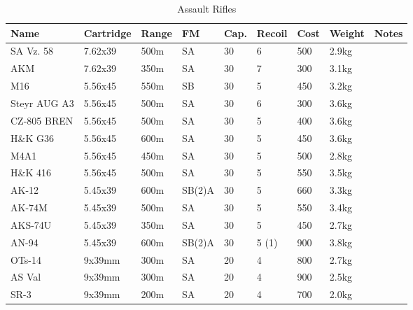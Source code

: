 \begin{table}
  \caption{Assault Rifles}
  \label{tab:AssaultRifles}
  \begin{center}
    \begin{tabular}{| l | l | l | l | l | l | l | l | l |}
      \hline
      \textbf{Name} & \textbf{Cartridge} & \textbf{Range} &
      \textbf{FM} & \textbf{Cap.} & \textbf{Recoil} &
      \textbf{Cost} & \textbf{Weight} & \textbf{Notes} \\ \hline

      SA Vz. 58    & 7.62x39 & 500m & SA  & 30 & 6 & 500 & 2.9kg & \\ \hline
      AKM          & 7.62x39 & 350m & SA  & 30 & 7 & 300 & 3.1kg & \\ \hline

      M16          & 5.56x45 & 550m & SB  & 30 & 5 & 450 & 3.2kg & \\ \hline
      Steyr AUG A3 & 5.56x45 & 500m & SA  & 30 & 6 & 300 & 3.6kg & \\ \hline
      CZ-805 BREN  & 5.56x45 & 500m & SA  & 30 & 5 & 400 & 3.6kg & \\ \hline
      H\&K G36     & 5.56x45 & 600m & SA  & 30 & 5 & 450 & 3.6kg & \\ \hline
      M4A1         & 5.56x45 & 450m & SA  & 30 & 5 & 500 & 2.8kg & \\ \hline
      H\&K 416     & 5.56x45 & 500m & SA  & 30 & 5 & 550 & 3.5kg & \\ \hline

      AK-12        & 5.45x39 & 600m & SB(2)A & 30 & 5 & 660 & 3.3kg & \\ \hline
      AK-74M       & 5.45x39 & 500m & SA     & 30 & 5 & 550 & 3.4kg & \\ \hline
      AKS-74U      & 5.45x39 & 350m & SA     & 30 & 5 & 450 & 2.7kg & \\ \hline
      AN-94        & 5.45x39 & 600m & SB(2)A & 30 & 5 (1) & 900 & 3.8kg & \\ \hline

      OTs-14       & 9x39mm  & 300m & SA     & 20 & 4 & 800 & 2.7kg & \\ \hline
      AS Val       & 9x39mm  & 300m & SA     & 20 & 4 & 900 & 2.5kg & \\ \hline
      SR-3         & 9x39mm  & 200m & SA     & 20 & 4 & 700 & 2.0kg & \\ \hline

    \end{tabular}
  \end{center}
\end{table}


